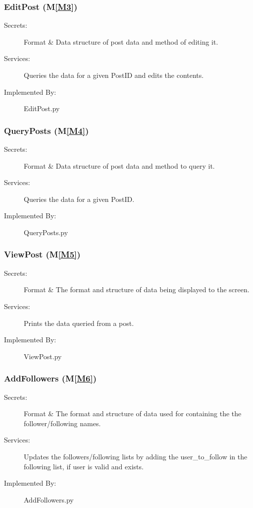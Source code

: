 \documentclass[12pt, titlepage]{article}
\newcommand{\mref}[1]{M\ref{#1}}
\begin{document}
\subsubsection{EditPost (\mref{M3})}
\begin{description}
\item[Secrets:]Format \& Data structure of post data and method of editing it.
\item[Services:] Queries the data for a given PostID and edits the contents.
\item[Implemented By:] EditPost.py
\end{description}

\subsubsection{QueryPosts (\mref{M4})}
\begin{description}
\item[Secrets:]Format \& Data structure of post data and method to query it.
\item[Services:] Queries the data for a given PostID.
\item[Implemented By:] QueryPosts.py
\end{description}

\subsubsection{ViewPost (\mref{M5})}
\begin{description}
\item[Secrets:]Format \& The format and structure of data being displayed to the screen.
\item[Services:] Prints the data queried from a post.
\item[Implemented By:] ViewPost.py
\end{description}

\subsubsection{AddFollowers (\mref{M6})}
\begin{description}
\item[Secrets:]Format \& The format and structure of data used for containing the the follower/following names.
\item[Services:] Updates the followers/following lists by adding the user\_to\_follow in the following list, if user is valid and exists.
\item[Implemented By:] AddFollowers.py
\end{description}
\end{document}
